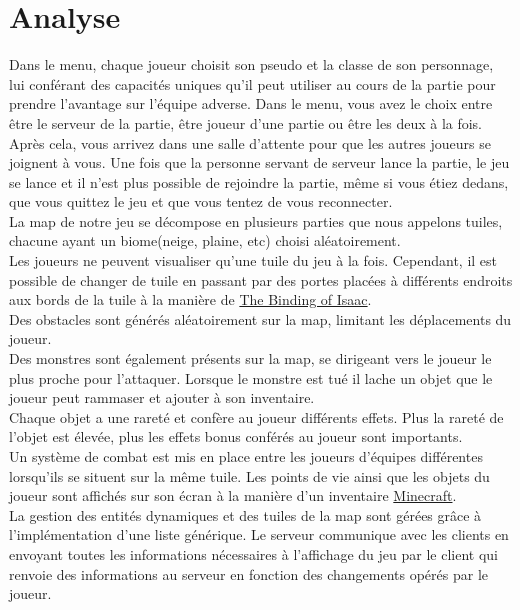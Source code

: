 \documentclass[11pt]{article}
\begin{document}
    \section{Analyse}
    Dans le menu, chaque joueur choisit son pseudo et la classe de son personnage, lui conférant des capacités uniques qu’il peut utiliser au cours de la partie pour 
    prendre l’avantage sur l’équipe adverse. Dans le menu, vous avez le choix entre être le serveur de la partie, être joueur d’une partie ou être les deux à la fois. \\
    Après cela, vous arrivez dans une salle d’attente pour que les autres joueurs se joignent à vous. Une fois que la personne servant de serveur lance la partie, 
    le jeu se lance et il n’est plus possible de rejoindre la partie, même si vous étiez dedans, que vous quittez le jeu et que vous tentez de vous reconnecter. \\
    La map de notre jeu se décompose en plusieurs parties que nous appelons tuiles, chacune ayant un biome(neige, plaine, etc) choisi aléatoirement. \\
    Les joueurs ne peuvent visualiser qu’une tuile du jeu à la fois. Cependant, il est possible de changer de tuile en passant par des portes placées à différents endroits 
    aux bords de la tuile à la manière de \href{https://en.wikipedia.org/wiki/The_Binding_of_Isaac_(video_game)}{The Binding of Isaac}. \\
    Des obstacles sont générés aléatoirement sur la map, limitant les déplacements du joueur. \\
    Des monstres sont également présents sur la map, se dirigeant vers le joueur le plus proche pour l’attaquer. Lorsque le monstre est tué il lache un objet que le joueur peut
    rammaser et ajouter à son inventaire.\\
    Chaque objet a une rareté et confère au joueur différents effets. Plus la rareté de l’objet est élevée, plus les effets bonus conférés au joueur sont importants. \\
    Un système de combat est mis en place entre les joueurs d’équipes différentes lorsqu’ils se situent sur la même tuile. 
    Les points de vie ainsi que les objets du joueur sont affichés sur son écran à la manière d’un inventaire \href{https://fr.wikipedia.org/wiki/Minecraft}{Minecraft}.\\ 
    La gestion des entités dynamiques et des tuiles de la map sont gérées grâce à l’implémentation d’une liste générique. 
    Le serveur communique avec les clients en envoyant toutes les informations nécessaires à l’affichage du jeu par le client qui renvoie des informations au serveur 
    en fonction des changements opérés par le joueur.
    
\end{document}
